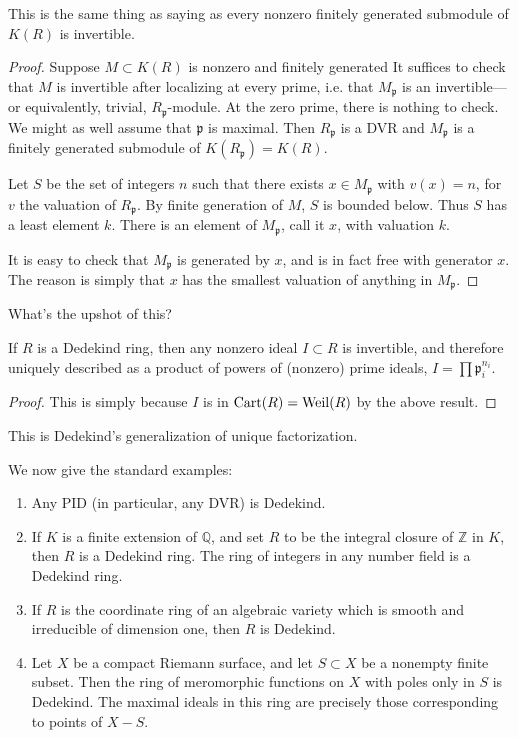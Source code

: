 This is the same thing as saying as every nonzero finitely generated submodule of $K(R)$ is
invertible.
\begin{proof} 
Suppose $M \subset K(R)$ is nonzero and finitely generated It suffices to check that $M$ is
invertible after localizing at every prime, i.e. that $M_{\mathfrak{p}}$ is
an invertible---or equivalently, trivial, $R_{\mathfrak{p}}$-module. At the
zero prime, there is nothing to check. We might as well assume that
$\mathfrak{p}$ is maximal. Then $R_{\mathfrak{p}}$ is a DVR and
$M_{\mathfrak{p}}$ is a finitely generated submodule of $K(R_{\mathfrak{p}}) = K(R)$. 

Let $S$ be the set of integers $n$ such that there exists $ x \in
M_{\mathfrak{p}}$ with $v(x) = n$, for $v$ the valuation of $R_{\mathfrak{p}}$.
By finite generation of $M$, $S$ is bounded below. Thus $S$ has a least element
$k$. There is an element of $M_{\mathfrak{p}}$, call it $x$, with valuation $k$.

It is easy to check that $M_{\mathfrak{p}}$ is generated by $x$, and is in fact free with
generator $x$. The reason is simply that $x$ has the smallest valuation of
anything in $M_{\mathfrak{p}}$.
\end{proof} 

What's the upshot of this?

\begin{theorem}
If $R$ is a Dedekind ring, then any nonzero ideal $I \subset R$ is invertible,
and therefore uniquely described as a product of powers of (nonzero) prime ideals, $I =
\prod \mathfrak{p}_i^{n_i}$.
\end{theorem} 
\begin{proof} 
This is simply because $I$ is in $\operatorname{Cart}(R) = \operatorname{Weil}(R)$ by the above result. 
\end{proof} 

This is Dedekind's generalization of unique factorization.

We now give the standard examples:
\begin{example} 
\begin{enumerate}
\item Any PID (in particular, any DVR) is Dedekind.  
\item If $K$ is a finite extension of $\mathbb{Q}$, and set $R $ to be the
integral closure of $\mathbb{Z}$ in $K$, then $R$ is a Dedekind ring. The ring
of integers in any number field is a Dedekind ring. 
\item If $R$ is the coordinate ring of an algebraic variety which is smooth and
irreducible of dimension one, then $R$ is Dedekind. 
\item  Let $X$ be a compact Riemann surface, and let $S \subset X$ be a
nonempty finite subset. Then the ring of meromorphic functions on $X$ with
poles only in $S$ is
Dedekind. The maximal ideals in this ring are precisely those corresponding to
points of $X-S$. 
\end{enumerate}
\end{example} 



